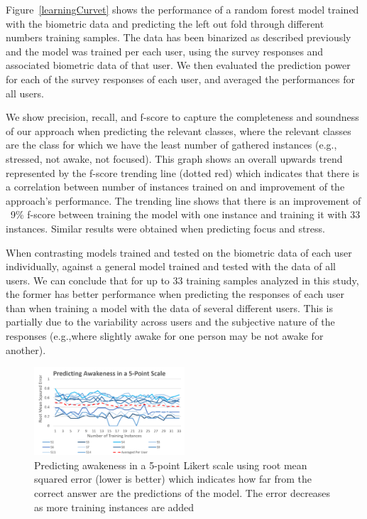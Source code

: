 Figure~\ref{learningCurvet} 
shows the performance of a random forest model
trained with the biometric data and predicting the 
left out fold through different numbers training samples.
The data has been binarized as described previously and
the model was trained per each user,
using the survey responses and associated biometric
data of that user. We then evaluated the prediction power for
each of the survey responses of each user, and averaged
the performances for all users.

We show precision, recall, and f-score
to capture the completeness and soundness of our approach 
when predicting the relevant classes, where the relevant
classes are the class for which we have the least number 
of gathered instances (e.g., stressed, not awake, not focused).
This graph shows an overall upwards trend represented by the 
f-score trending line (dotted red) which indicates
that there is a correlation between number of instances trained
on and improvement of the approach's performance.
The trending line shows that there is an improvement of ~9\%
f-score
between training the model with one instance and training
it with 33 instances. Similar results were obtained
when predicting focus and stress.

When contrasting
models trained and tested on the 
biometric data of each user individually, against
a general model trained and tested with the data of all users. 
We can conclude
that for up to 33 training samples analyzed in this study,
the former has better performance when predicting the
responses of each user than when training 
a model with the data of several different users. 
This is partially due to the 
variability across users and the subjective nature
of the responses (e.g.,where slightly awake for one person
may be not awake for another). 

\begin{figure}
  \centering
      \includegraphics[width=0.5\textwidth]{20180914Awakeness5PointScaleOnly15Lines.png}
  \caption{
Predicting awakeness in a 5-point Likert scale using root mean squared error 
(lower is better)
which indicates how 
  far from the correct answer are the predictions of the model.
  The error decreases as more training instances are added
  }
   \label{learningCurveb}
\end{figure}

